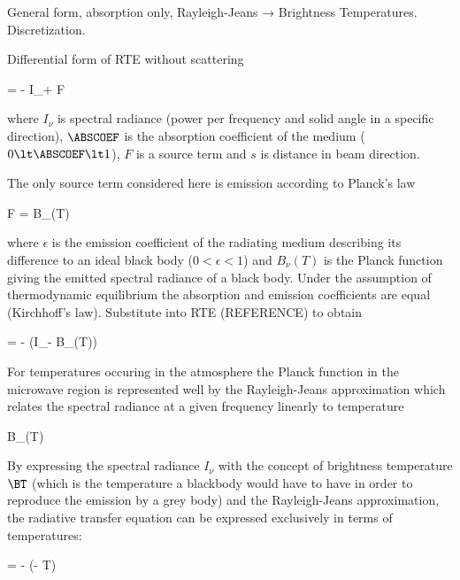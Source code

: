 \startsection[title=The Radiative Transfer Equation]

    General form, absorption only, Rayleigh-Jeans → Brightness Temperatures.
    Discretization.

    Differential form of RTE without scattering

    \startformula
         = - I_\nu \ABSCOEF + F \EQCOMMA
    \stopformula

    where $I_\nu$ is spectral radiance (power per frequency and solid angle in
    a specific direction), $\ABSCOEF$ is the absorption coefficient of the medium
    ($0 \lt \ABSCOEF \lt 1$), $F$ is a source term and $s$ is distance in beam
    direction.

    The only source term considered here is emission according to Planck's law

    \startformula
        F = \epsilon B_\nu(T) \EQCOMMA
    \stopformula

    where $\epsilon$ is the emission coefficient of the radiating medium
    describing its difference to an ideal black body ($0 \lt \epsilon \lt 1$)
    and $B_\nu(T)$ is the Planck function giving the emitted spectral radiance
    of a black body. Under the assumption of thermodynamic equilibrium the
    absorption and emission coefficients are equal (Kirchhoff's law).
    Substitute into RTE (REFERENCE) to obtain

    \startformula
         = - \ABSCOEF(I_\nu - B_\nu(T)) \EQSTOP
    \stopformula

    For temperatures occuring in the atmosphere the Planck function in the
    microwave region is represented well by the Rayleigh-Jeans approximation
    which relates the spectral radiance at a given frequency linearly to
    temperature

    \startformula
        B_\nu(T) \approx {} \EQSTOP
    \stopformula

    By expressing the spectral radiance $I_\nu$ with the concept of brightness
    temperature $\BT$ (which is the temperature a blackbody would have to have
    in order to reproduce the emission by a grey body) and the Rayleigh-Jeans
    approximation, the radiative transfer equation can be expressed exclusively
    in terms of temperatures:

    \startformula
         = - \ABSCOEF (\BT - T) \EQSTOP
    \stopformula

    \startsubsection[title={A Solution for Radiometer Applications}]


